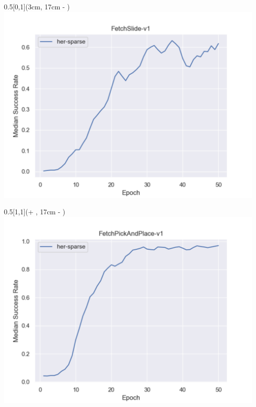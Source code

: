 \begin{frame}
	\begin{textblock*}{0.5\paperwidth}[0,1](3cm, 17cm - \PraesentationSeitenrand)%
		\includegraphics[width=0.3\paperwidth]{./Ressourcen/Figures/fig_FetchSlide-v1.pdf}
	\end{textblock*}
	
	\begin{textblock*}{0.5\paperwidth}[1,1](\textwidth + \PraesentationSeitenrand, 17cm - \PraesentationSeitenrand)%
		\includegraphics[width=0.3\paperwidth]{./Ressourcen/Figures/fig_FetchPickAndPlace-v1.pdf}
	\end{textblock*}
	
	
	
\end{frame}
\clearpage

